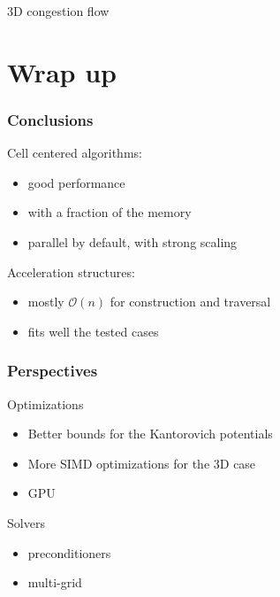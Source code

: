 \documentclass[aspectratio=169]{beamer}
\begin{document}
\begin{frame}
\begin{minipage}[c][0.8\textheight][c]{0.55\textwidth}
\begin{center}
            3D congestion flow
        \end{center}
    \end{minipage}
\end{frame}

\section{Wrap up}

\begin{frame}
    \frametitle{Conclusions}

    Cell centered algorithms:
    \begin{itemize}
        \item good performance
        \item with a fraction of the memory
        \item parallel by default, with strong scaling
    \end{itemize}
    
    \vfill
    Acceleration structures:
    \begin{itemize}
        \item mostly $\mathcal{O}( n )$ for construction and traversal
        \item fits well the tested cases
    \end{itemize}
\end{frame}

\begin{frame}
    \frametitle{Perspectives}

    Optimizations
    \begin{itemize}
        \item Better bounds for the Kantorovich potentials
        \item More SIMD optimizations for the 3D case
        \item GPU
    \end{itemize}

    \vfill
    Solvers
    \begin{itemize}
        \item preconditioners
        \item multi-grid
    \end{itemize}
\end{frame}
\end{document}
